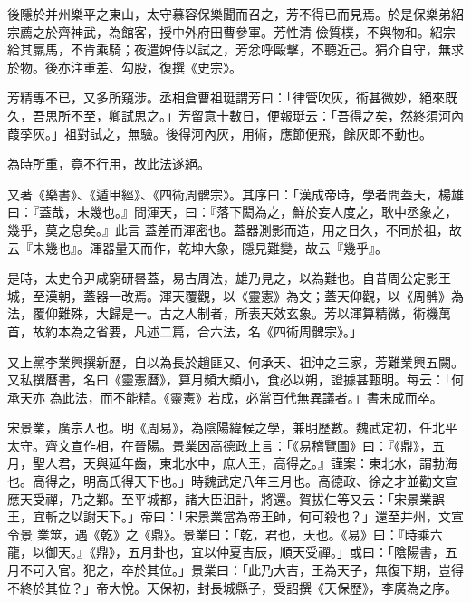 \begin{pinyinscope}
 後隱於并州樂平之東山，太守慕容保樂聞而召之，芳不得已而見焉。於是保樂弟紹宗薦之於齊神武，為館客，授中外府田曹參軍。芳性清
 儉質樸，不與物和。紹宗給其羸馬，不肯乘騎；夜遣婢侍以試之，芳忿呼毆擊，不聽近己。狷介自守，無求於物。後亦注重差、勾股，復撰《史宗》。



 芳精專不已，又多所窺涉。丞相倉曹祖珽謂芳曰：「律管吹灰，術甚微妙，絕來既久，吾思所不至，卿試思之。」芳留意十數日，便報珽云：「吾得之矣，然終須河內葭莩灰。」祖對試之，無驗。後得河內灰，用術，應節便飛，餘灰即不動也。



 為時所重，竟不行用，故此法遂絕。



 又著《樂書》、《遁甲經》、《四術周髀宗》。其序曰：「漢成帝時，學者問蓋天，楊雄曰：『蓋哉，未幾也。』問渾天，曰：『落下閎為之，鮮於妄人度之，耿中丞象之，幾乎，莫之息矣。』此言
 蓋差而渾密也。蓋器測影而造，用之日久，不同於祖，故云『未幾也』。渾器量天而作，乾坤大象，隱見難變，故云『幾乎』。



 是時，太史令尹咸窮研晷蓋，易古周法，雄乃見之，以為難也。自昔周公定影王城，至漢朝，蓋器一改焉。渾天覆觀，以《靈憲》為文；蓋天仰觀，以《周髀》為法，覆仰難殊，大歸是一。古之人制者，所表天效玄象。芳以渾算精微，術機萬首，故約本為之省要，凡述二篇，合六法，名《四術周髀宗》。」



 又上黨李業興撰新歷，自以為長於趙匪又、何承天、祖沖之三家，芳難業興五闕。又私撰曆書，名曰《靈憲曆》，算月頻大頻小，食必以朔，證據甚甄明。每云：「何承天亦
 為此法，而不能精。《靈憲》若成，必當百代無異議者。」書未成而卒。



 宋景業，廣宗人也。明《周易》，為陰陽緯候之學，兼明歷數。魏武定初，任北平太守。齊文宣作相，在晉陽。景業因高德政上言：「《易稽覽圖》曰：『《鼎》，五月，聖人君，天與延年齒，東北水中，庶人王，高得之。』謹案：東北水，謂勃海也。高得之，明高氏得天下也。」時魏武定八年三月也。高德政、徐之才並勸文宣應天受禪，乃之鄴。至平城都，諸大臣沮計，將還。賀拔仁等又云：「宋景業誤王，宜斬之以謝天下。」帝曰：「宋景業當為帝王師，何可殺也？」還至并州，文宣令景
 業筮，遇《乾》之《鼎》。景業曰：「乾，君也，天也。《易》曰：『時乘六龍，以御天。』《鼎》，五月卦也，宜以仲夏吉辰，順天受禪。」或曰：「陰陽書，五月不可入官。犯之，卒於其位。」景業曰：「此乃大吉，王為天子，無復下期，豈得不終於其位？」帝大悅。天保初，封長城縣子，受詔撰《天保歷》，李廣為之序。




\end{pinyinscope}
